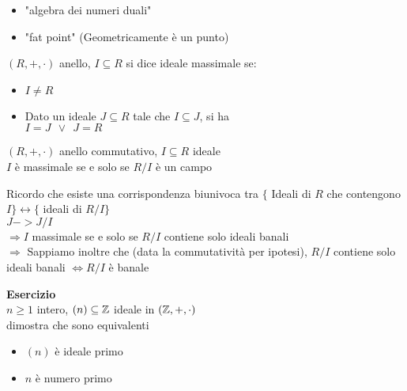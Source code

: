 \documentclass[12px]{article}
\begin{document}
	 \begin{itemize}
		 \item "algebra dei numeri duali"
		 \item "fat point" (Geometricamente è un punto)
	 \end{itemize}
	 \begin{defi}
		 $(R,+,\cdot)$ anello, $I\subseteq R$ si dice ideale massimale se:\\
		 \begin{itemize}
			 \item $I\neq R$
			 \item Dato un ideale $J\subseteq R$ tale che $I\subseteq J$, si ha\\
				 $I = J \ \ \vee \ \ J = R$

		 \end{itemize}
	 \end{defi}
	 \begin{teo}
	 	$(R,+,\cdot)$ anello commutativo,  $I\subseteq R$ ideale\\
		$I$ è massimale se e solo se $R/I$ è un campo
	 \end{teo}
	 \begin{dimo}
		 Ricordo che esiste una corrispondenza biunivoca tra $\{$ Ideali di $R$ che  contengono $I\} \leftrightarrow\{$  ideali di  $R/I\}$\\
		  $J -> J/I$\\
		   $ \Rightarrow I$ massimale se e solo se $R/I$ contiene solo ideali banali\\
		   $ \Rightarrow $ Sappiamo inoltre che (data la commutatività per ipotesi), $R/I$ contiene solo ideali banali  $ \Leftrightarrow R/I$ è banale
	 \end{dimo}
	 \textbf{Esercizio}\\
	 $n\geq 1 $ intero, $(n)\subseteq \mathbb{Z}$ ideale in  $(\mathbb{Z},+,\cdot)$\\
	 dimostra che sono equivalenti
	  \begin{itemize}
		  \item $(n) $ è ideale primo\\
		  \item $n$ è numero primo
	 \end{itemize}
\end{document}
